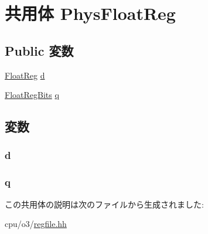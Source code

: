 \hypertarget{unionPhysRegFile_1_1PhysFloatReg}{
\section{共用体 PhysFloatReg}
\label{unionPhysRegFile_1_1PhysFloatReg}
}
\subsection*{Public 変数}
\begin{DoxyCompactItemize}
\item 
\hyperlink{classPhysRegFile_a75484259f1855aabc8d74c6eb1cfe186}{FloatReg} \hyperlink{unionPhysRegFile_1_1PhysFloatReg_a72e0a6546324fc89c60ed3c568482847}{d}
\item 
\hyperlink{classPhysRegFile_aab5eeae86499f9bfe15ef79360eccc64}{FloatRegBits} \hyperlink{unionPhysRegFile_1_1PhysFloatReg_a9d7edcae66d1eadb719f2b2fb447186d}{q}
\end{DoxyCompactItemize}


\subsection{変数}
\hypertarget{unionPhysRegFile_1_1PhysFloatReg_a72e0a6546324fc89c60ed3c568482847}{
\subsubsection[{d}]{ {\bf d}}}
\label{unionPhysRegFile_1_1PhysFloatReg_a72e0a6546324fc89c60ed3c568482847}
\hypertarget{unionPhysRegFile_1_1PhysFloatReg_a9d7edcae66d1eadb719f2b2fb447186d}{
\subsubsection[{q}]{ {\bf q}}}
\label{unionPhysRegFile_1_1PhysFloatReg_a9d7edcae66d1eadb719f2b2fb447186d}


この共用体の説明は次のファイルから生成されました:\begin{DoxyCompactItemize}
\item 
cpu/o3/\hyperlink{regfile_8hh}{regfile.hh}\end{DoxyCompactItemize}
